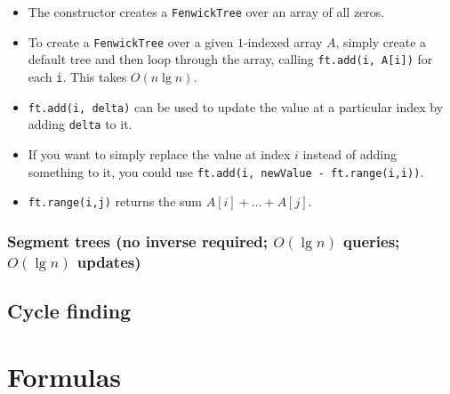 \documentclass[10pt]{book}
\newif\iftodos
\newcommand{\todo}[1]{\iftodos\textcolor{red}{[TODO: #1]}\fi}
\begin{document}

\begin{itemize}
\item The constructor creates a \texttt{FenwickTree} over an array of
  all zeros.
\item To create a \texttt{FenwickTree} over a given $1$-indexed array
  $A$, simply create a default tree and then loop through the array,
  calling \texttt{ft.add(i, A[i])} for each \texttt{i}.  This takes
  $O(n \lg n)$.
\item \texttt{ft.add(i, delta)} can be used to update the value at a
  particular index by adding \texttt{delta} to it.
\item If you want to simply replace the value at index $i$ instead of
  adding something to it, you could use \texttt{ft.add(i, newValue - ft.range(i,i))}.
\item \texttt{ft.range(i,j)} returns the sum $A[i] + \dots + A[j]$.
\end{itemize}

\todo{Discuss CP3 presentation of Fenwick trees; explain how Fenwick
  trees work}

\subsection{Segment trees (no inverse required; $O(\lg n)$ queries;
  $O(\lg n)$ updates)} \label{sec:segment-trees}

\todo{Segment trees.}

\section{Cycle finding} \label{sec:cycle-finding}

\todo{Floyd's algorithm, Brent's algorithm}

\chapter{Formulas} \label{chap:formulas}
\end{document}
